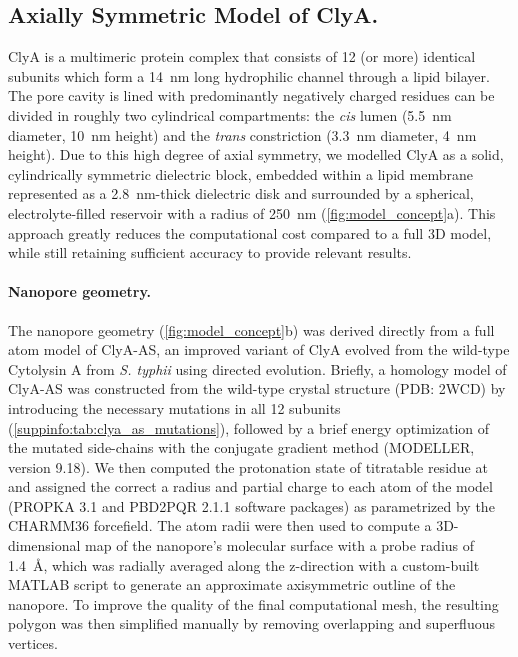 \documentclass[journal=ancac3, manuscript=article, etalmode=truncate,maxauthors=0]{achemso}
\begin{document}
\subsection{Axially Symmetric Model of ClyA.}

ClyA is a multimeric protein complex that consists of 12 (or more) identical subunits which form a \SI{14}{\nano\meter} long hydrophilic channel through a lipid bilayer.
The pore cavity is lined with predominantly negatively charged residues can be divided in roughly two cylindrical compartments:
the \textit{cis} lumen (\SI{5.5}{\nano\meter} diameter, \SI{10}{\nano\meter} height) and
the \textit{trans} constriction (\SI{3.3}{\nano\meter} diameter, \SI{4}{\nano\meter} height).
Due to this high degree of axial symmetry, we modelled ClyA as a solid, cylindrically symmetric dielectric block,
embedded within a lipid membrane represented as a \SI{2.8}{\nano\meter}-thick\cite{kucerka2011} dielectric disk 
and surrounded by a spherical, electrolyte-filled reservoir with a radius of \SI{250}{\nano\meter} (\cref{fig:model_concept}a).\cite{lu2012,pederson2015}
This approach greatly reduces the computational cost compared to a full 3D model, while still retaining sufficient accuracy to provide relevant results. 

\paragraph{Nanopore geometry.}
The nanopore geometry (\cref{fig:model_concept}b) was derived directly from a full atom model of ClyA-AS,
an improved variant of ClyA evolved from the wild-type Cytolysin A from \textit{S. typhii} using directed evolution.\cite{soskine2013}
Briefly, a homology model of ClyA-AS was constructed from the wild-type crystal structure (PDB: 2WCD)\cite{mueller2009} by introducing the necessary mutations in all 12 subunits (\cref{suppinfo:tab:clya_as_mutations}),
followed by a brief energy optimization of the mutated side-chains with the conjugate gradient method (MODELLER, version 9.18).\cite{sali1993}
We then computed the protonation state of titratable residue at  and 
assigned the correct a radius and partial charge to each atom of the model (PROPKA 3.1\cite{olsson2011} and PBD2PQR 2.1.1\cite{jurrus2018} software packages)
as parametrized by the CHARMM36 forcefield.\cite{best2012}
The atom radii were then used to compute a 3D-dimensional map of the nanopore's molecular surface with a probe radius of \SI{1.4}{\angstrom},
which was radially averaged along the z-direction with a custom-built MATLAB script to generate an approximate axisymmetric outline of the nanopore.
To improve the quality of the final computational mesh, the resulting polygon was then simplified manually by removing overlapping and superfluous vertices.
\end{document}
